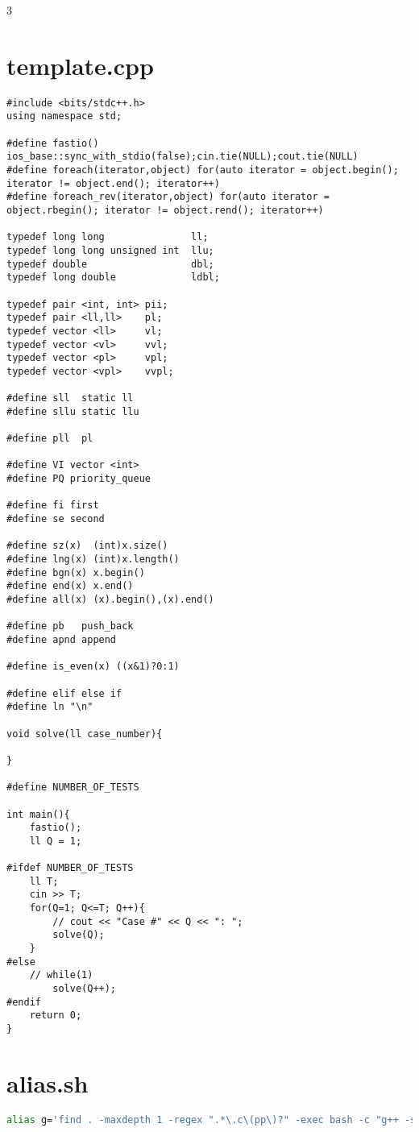 \documentclass[a4paper,landscape,8pt]{extarticle}
\begin{document}
\begin{multicols}{3}

\section*{template.cpp}

\begin{lstlisting}
#include <bits/stdc++.h>
using namespace std;

#define fastio() ios_base::sync_with_stdio(false);cin.tie(NULL);cout.tie(NULL)
#define foreach(iterator,object) for(auto iterator = object.begin(); iterator != object.end(); iterator++)
#define foreach_rev(iterator,object) for(auto iterator = object.rbegin(); iterator != object.rend(); iterator++)

typedef long long               ll;
typedef long long unsigned int  llu;
typedef double                  dbl;
typedef long double             ldbl;

typedef pair <int, int> pii;
typedef pair <ll,ll>    pl;
typedef vector <ll>     vl;
typedef vector <vl>     vvl;
typedef vector <pl>     vpl;
typedef vector <vpl>    vvpl;

#define sll  static ll
#define sllu static llu

#define pll  pl

#define VI vector <int>
#define PQ priority_queue

#define fi first
#define se second

#define sz(x)  (int)x.size()
#define lng(x) (int)x.length()
#define bgn(x) x.begin()
#define end(x) x.end()
#define all(x) (x).begin(),(x).end()

#define pb   push_back
#define apnd append

#define is_even(x) ((x&1)?0:1)

#define elif else if
#define ln "\n"

void solve(ll case_number){
    
}

#define NUMBER_OF_TESTS

int main(){
    fastio();
    ll Q = 1;

#ifdef NUMBER_OF_TESTS
    ll T;
    cin >> T;
    for(Q=1; Q<=T; Q++){
        // cout << "Case #" << Q << ": ";
        solve(Q);
    }
#else
    // while(1)
        solve(Q++);
#endif
    return 0;
}
\end{lstlisting}

\section*{alias.sh}
\begin{lstlisting}[language=bash]
alias g='find . -maxdepth 1 -regex ".*\.c\(pp\)?" -exec bash -c "g++ -std=gnu++17 -g3 -fdiagnostics-color=always -o {}.o.tmp -c {} 2>&1 | head -n 10" ";"; g++ -o "$(basename "$(pwd)")" *.o.tmp 2> /dev/null; rm *.o.tmp 2> /dev/null'
\end{lstlisting}


\end{multicols}
\end{document}
